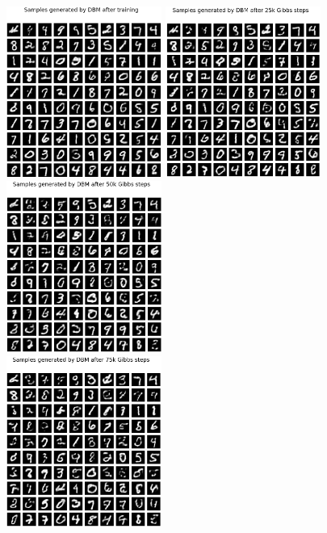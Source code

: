 \begin{figure}[h]
\begin{mdframed}
\centering
\includegraphics[width=2in]{dbm-mnist/samples_0k.png}
\quad
\includegraphics[width=2in]{dbm-mnist/samples_25k.png}
\quad
\includegraphics[width=2in]{dbm-mnist/samples_50k.png}
\\[2em]
\includegraphics[width=2in]{dbm-mnist/samples_75k.png}

\end{mdframed}
\end{figure}
